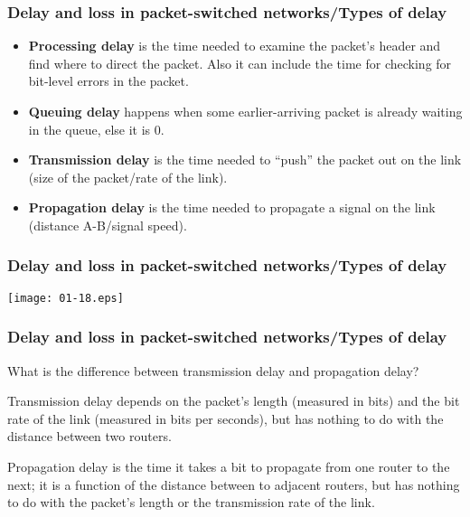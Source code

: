 %
\begin{frame}
\frametitle{Delay and loss in packet-switched networks/Types of delay}

\begin{itemize}

  \item \textbf{Processing delay} is the time needed to examine the
    packet's header and find where to direct the packet. Also it can
    include the time for checking for bit-level errors in the packet.

    \item \textbf{Queuing delay} happens when some earlier-arriving
      packet is already waiting in the queue, else it is 0.

    \item \textbf{Transmission delay} is the time needed to ``push''
      the packet out on the link (size of the packet/rate of the
      link).

    \item \textbf{Propagation delay} is the time needed to propagate
      a signal on the link (distance A-B/signal speed).

\end{itemize}

\end{frame}

%
\begin{frame}
\frametitle{Delay and loss in packet-switched networks/Types of delay}

\begin{center}
  \texttt{[image: 01-18.eps]}
\end{center}

\end{frame}

%
\begin{frame}
\frametitle{Delay and loss in packet-switched networks/Types of delay}

What is the difference between transmission delay and propagation
delay?

\bigskip

Transmission delay depends on the packet's length (measured in bits)
and the bit rate of the link (measured in bits per seconds), but has
nothing to do with the distance between two routers.

\bigskip

Propagation delay is the time it takes a bit to propagate from one
router to the next; it is a function of the distance between to
adjacent routers, but has nothing to do with the packet's length or
the transmission rate of the link.

\end{frame}


